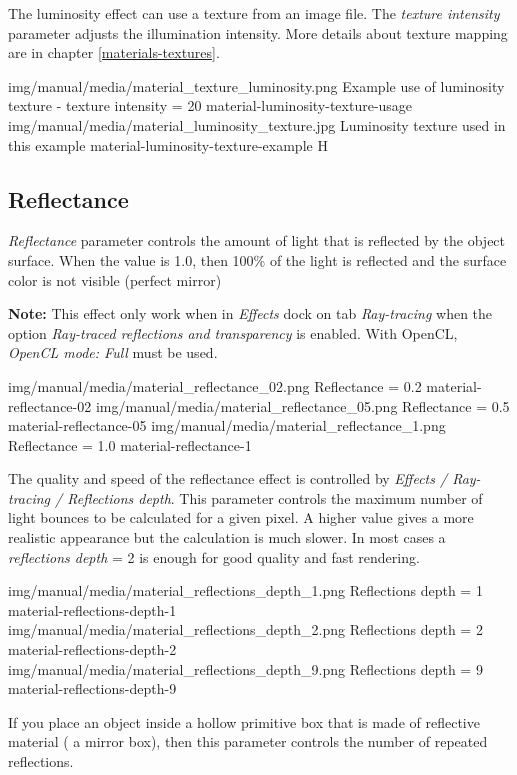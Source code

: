 The luminosity effect can use a texture from an image file. The \emph{texture intensity} parameter adjusts the illumination intensity. More details about texture mapping are in chapter \ref{materials-textures}.

\twoImagesWithTwoCaptionsFullWidth
{img/manual/media/material_texture_luminosity.png}
{Example use of luminosity texture - texture intensity = 20}
{material-luminosity-texture-usage}
{img/manual/media/material_luminosity_texture.jpg}
{Luminosity texture used in this example}
{material-luminosity-texture-example}
{H}


\subsection{Reflectance}\label{materials-reflectance}

\emph{Reflectance} parameter controls the amount of light that is reflected by the object surface. When the value is 1.0, then 100\% of the light is reflected and the surface color is not visible (perfect mirror)

\textbf{Note: }This effect only work when in \emph{Effects} dock on tab \emph{Ray-tracing} when the option \emph{Ray-traced reflections and transparency} is enabled. With OpenCL, \emph{OpenCL mode: Full} must be used.

\threeImagesWithTwoCaptionsFullWidth
{img/manual/media/material_reflectance_02.png}
{Reflectance = 0.2}
{material-reflectance-02}
{img/manual/media/material_reflectance_05.png}
{Reflectance = 0.5}
{material-reflectance-05}
{img/manual/media/material_reflectance_1.png}
{Reflectance = 1.0}
{material-reflectance-1}

The quality and speed of the reflectance effect is controlled by \emph{Effects / Ray-tracing / Reflections depth}. This parameter controls the maximum number of light bounces to be calculated for a given pixel. A higher value gives a more realistic appearance but the calculation is much slower. In most cases a \emph{reflections depth} = 2 is enough for good quality and fast rendering.

\threeImagesWithTwoCaptionsFullWidth
{img/manual/media/material_reflections_depth_1.png}
{Reflections depth = 1}
{material-reflections-depth-1}
{img/manual/media/material_reflections_depth_2.png}
{Reflections depth = 2}
{material-reflections-depth-2}
{img/manual/media/material_reflections_depth_9.png}
{Reflections depth = 9}
{material-reflections-depth-9}

If you place an object inside a hollow primitive box that is made of reflective material ( a mirror box), then this parameter controls the number of repeated reflections.

